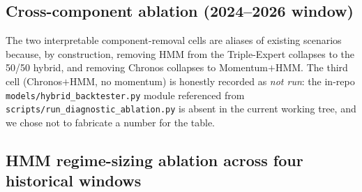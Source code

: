 \documentclass[conference]{IEEEtran}
\begin{document}
\subsection{Cross-component ablation (2024--2026 window)}
\begin{table}[ht]
\centering
\caption{Net-of-friction performance on the 2024--2026 out-of-sample window.}
\label{tab:ablation}
\end{table}

The two interpretable component-removal cells are aliases of existing
scenarios because, by construction, removing HMM from the Triple-Expert
collapses to the 50/50 hybrid, and removing Chronos collapses to
Momentum$+$HMM. The third cell (Chronos$+$HMM, no momentum) is honestly
recorded as \emph{not run}: the in-repo \texttt{models/hybrid\_backtester.py}
module referenced from \texttt{scripts/run\_diagnostic\_ablation.py} is absent
in the current working tree, and we chose not to fabricate a number for the
table.

\subsection{HMM regime-sizing ablation across four historical windows}
\end{document}
